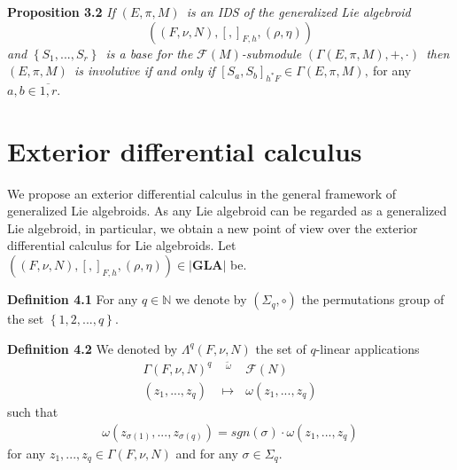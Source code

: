 \documentclass[11pt]{article}
\begin{document}
\textbf{Proposition 3.2 }\emph{If }$\left( E,\pi ,M\right) $\emph{\ is an
IDS of the generalized Lie algebroid }%
\begin{equation*}
\left( \left( F,\nu ,N\right) ,\left[ ,\right] _{F,h},\left( \rho ,\eta
\right) \right)
\end{equation*}%
\emph{and }$\left\{ S_{1},...,S_{r}\right\} $\emph{\ is a base for the }$%
\mathcal{F}\left( M\right) $\emph{-submodule }$\left( \Gamma \left( E,\pi
,M\right) ,+,\cdot \right) $\emph{\ then }$\left( E,\pi ,M\right) $\emph{\
is involutive if and only if }$\left[ S_{a},S_{b}\right] _{h^{\ast }F}\in
\Gamma \left( E,\pi ,M\right) ,~$for any $a,b\in \overline{1,r}.$

\section{Exterior differential calculus}

We propose an exterior differential calculus in the general framework of
generalized Lie algebroids. As any Lie algebroid can be regarded as a
generalized Lie algebroid, in particular, we obtain a new point of view over
the exterior differential calculus for Lie algebroids. Let $\left( \left(
F,\nu ,N\right) ,\left[ ,\right] _{F,h},\left( \rho ,\eta \right) \right)
\in \left\vert \mathbf{GLA}\right\vert $ be.

\textbf{Definition 4.1 }For any $q\in \mathbb{N}$ we denote by $\left(
\Sigma _{q},\circ \right) $ the permutations group of the set $\left\{
1,2,...,q\right\} .$

\textbf{Definition 4.2 }We denoted by $\Lambda ^{q}\left( F,\nu ,N\right) $
the set of $q$-linear applications
\begin{equation*}
\begin{array}{ccc}
\Gamma \left( F,\nu ,N\right) ^{q} & ^{\underrightarrow{\ \ \omega \ \ }} &
\mathcal{F}\left( N\right) \\
\left( z_{1},...,z_{q}\right) & \longmapsto & \omega \left(
z_{1},...,z_{q}\right)%
\end{array}%
\end{equation*}%
such that
\begin{equation*}
\begin{array}{c}
\omega \left( z_{\sigma \left( 1\right) },...,z_{\sigma \left( q\right)
}\right) =sgn\left( \sigma \right) \cdot \omega \left( z_{1},...,z_{q}\right)%
\end{array}%
\end{equation*}%
for any $z_{1},...,z_{q}\in \Gamma \left( F,\nu ,N\right) $ and for any $%
\sigma \in \Sigma _{q}$.
\end{document}
